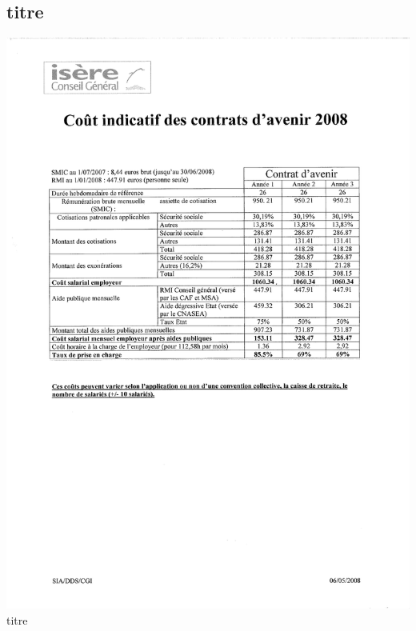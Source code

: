 \subsection{titre}
\begin{center}
\includegraphics[scale=0.6]{annexes/images/contrats_avenir_indicatif.pdf} \\
titre
\end{center}
